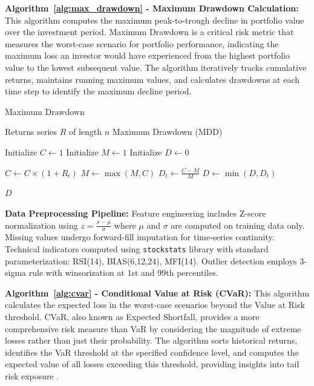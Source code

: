 \documentclass[3p,times,procedia]{elsarticle}
\begin{document}
\textbf{Algorithm~\ref{alg:max_drawdown} - Maximum Drawdown Calculation:} This algorithm computes the maximum peak-to-trough decline in portfolio value over the investment period. Maximum Drawdown is a critical risk metric that measures the worst-case scenario for portfolio performance, indicating the maximum loss an investor would have experienced from the highest portfolio value to the lowest subsequent value. The algorithm iteratively tracks cumulative returns, maintains running maximum values, and calculates drawdowns at each time step to identify the maximum decline period.

\begin{algorithm}[H]
\caption{Maximum Drawdown}
\label{alg:max_drawdown}
\begin{algorithmic}[1]
    \Require Returns series \( R \) of length \( n \)
    \Ensure Maximum Drawdown (MDD)
    
    \State Initialize \( C \gets 1 \) 
    \State Initialize \( M \gets 1 \) 
    \State Initialize \( D \gets 0 \) 

        \State \( C \gets C \times (1 + R_t) \) 
        \State \( M \gets \max(M, C) \) 
        \State \( D_t \gets \frac{C - M}{M} \) 
        \State \( D \gets \min(D, D_t) \) 
    \EndFor

    \State \Return \( D \)
\end{algorithmic}
\end{algorithm}

\textbf{Data Preprocessing Pipeline:} Feature engineering includes Z-score normalization using $z = \frac{x - \mu}{\sigma}$ where $\mu$ and $\sigma$ are computed on training data only. Missing values undergo forward-fill imputation for time-series continuity. Technical indicators computed using \texttt{stockstats} library with standard parameterization: RSI(14), BIAS(6,12,24), MFI(14). Outlier detection employs 3-sigma rule with winsorization at 1st and 99th percentiles.

\textbf{Algorithm~\ref{alg:cvar} - Conditional Value at Risk (CVaR):} This algorithm calculates the expected loss in the worst-case scenarios beyond the Value at Risk threshold. CVaR, also known as Expected Shortfall, provides a more comprehensive risk measure than VaR by considering the magnitude of extreme losses rather than just their probability. The algorithm sorts historical returns, identifies the VaR threshold at the specified confidence level, and computes the expected value of all losses exceeding this threshold, providing insights into tail risk exposure \cite{Rockafellar2000}.
\end{document}
